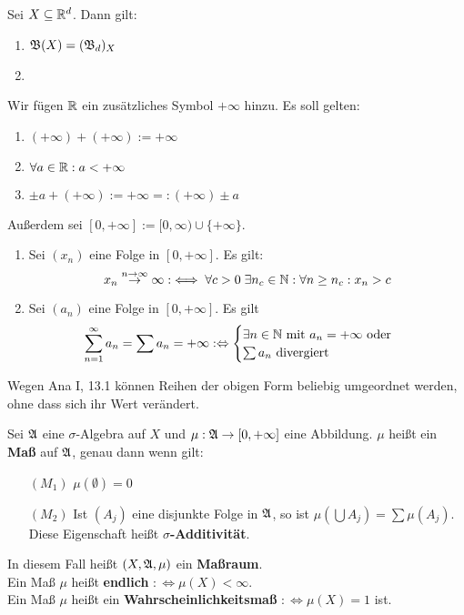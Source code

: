 \begin{folgerungen}
    Sei $X\subseteq\mathbb{R}^d$. Dann gilt:
    \begin{enumerate}
        \item $\mathfrak{B}(X)=(\mathfrak{B}_d)_X$
        \item {}
    \end{enumerate}
\end{folgerungen}

\begin{definition}
Wir fügen $\mathbb{R}$ ein zusätzliches Symbol $+\infty$ hinzu. Es soll gelten:
\begin{enumerate}
    \item $(+\infty)+(+\infty):=+\infty$
    \item $\forall a\in\mathbb{R}:a<+\infty$
    \item $\pm a+(+\infty):=+\infty=:(+\infty)\pm a$
\end{enumerate}
Außerdem sei $[0,+\infty]:=[0,\infty)\cup\{+\infty\}$.
\begin{enumerate}
    \item Sei $(x_n)$ eine Folge in $[0,+\infty]$. Es gilt:
          \[x_n\stackrel{n\to\infty}{\to}\infty:\iff \forall c>0\;\exists n_c\in\mathbb{N}:\forall n\ge n_c: x_n> c\]
    \item Sei $(a_n)$ eine Folge in $[0,+\infty]$. Es gilt
          \[\sum_{n=1}^\infty a_n=\sum a_n = +\infty :\Leftrightarrow
            \begin{cases}
                \exists n \in \mathbb{N} \text{ mit } a_n = +\infty \text{ oder }\\
                \sum a_n \text{ divergiert}
            \end{cases} 
          \]
\end{enumerate} 
Wegen Ana I, 13.1 können Reihen der obigen Form beliebig umgeordnet 
werden, ohne dass sich ihr Wert verändert.
\end{definition}

\begin{definition}
Sei $\mathfrak{A}$ eine $\sigma$-Algebra auf $X$ und $\mu:\mathfrak{A}\to[0,+\infty]$ 
eine Abbildung. $\mu$ heißt ein \textbf{Maß} auf $\mathfrak{A}$, genau dann 
wenn gilt:
\begin{enumerate}
\item[$(M_1)$] $\mu(\emptyset)=0$
\item[$(M_2)$] Ist $(A_j)$ eine disjunkte Folge in $\mathfrak{A}$, so ist 
$\mu(\bigcup A_j)=\sum\mu(A_j)$. Diese Eigenschaft heißt 
\textbf{$\sigma$-Additivität}.
\end{enumerate}
In diesem Fall heißt $(X,\mathfrak{A},\mu)$ ein \textbf{Maßraum}.\\
Ein Maß $\mu$ heißt \textbf{endlich} $:\Leftrightarrow \mu(X)<\infty$.\\
Ein Maß $\mu$ heißt ein \textbf{Wahrscheinlichkeitsmaß} $:\Leftrightarrow\mu(X)=1$ ist.
\end{definition}

